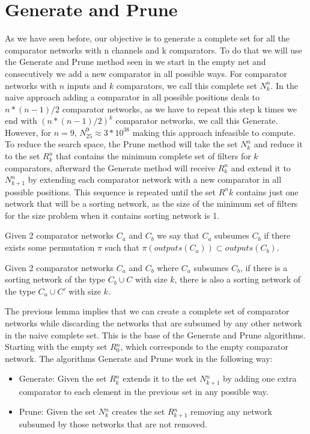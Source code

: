 \documentclass[../main.tex]{subfiles}
\begin{document}
	\section{Generate and Prune}
	As we have seen before, our objective is to generate a complete set for all the comparator networks with n channels and k comparators. To do that we will use the Generate and Prune method seen in \cite{sortingnineinputs} we start in the empty net and consecutively we add a new comparator in all possible ways. For comparator networks with $n$ inputs and $k$ comparators, we call this complete set $N^{n}_{k}$. In the naive approach adding a comparator in all possible positions deals to $n*(n-1)/2$ comparator networks, as we have to repeat this step k times we end with $(n*(n-1)/2)^k$ comparator networks, we call this Generate. However, for $n=9$, $N^{9}_{25}\approx 3*10^{38}$ making this approach infeasible to compute. To reduce the search space, the Prune method will take the set $N^{n}_{k}$ and reduce it to the set $R^{n}_{k}$ that contains the minimum complete set of filters for $k$ comparators, afterward the Generate method will receive $R^{n}_{k}$ and extend it to $N^{n}_{k+1}$ by extending each comparator network with a new comparator in all possible positions. This sequence is repeated until the set $R^{n}{k}$ contains just one network that will be a sorting network, as the size of the minimum set of filters for the size problem when it contains sorting network is 1.
	
	\begin{definition}
		Given 2 comparator networks $C_a$ and $C_b$ we say that $C_a$ subsumes $C_b$ if there exists some permutation $\pi$ such that $\pi (outputs(C_a)) \subset outputs(C_b)$.
	\end{definition}
	
	\begin{lemma}
		Given 2 comparator networks $C_a$ and $C_b$ where $C_a$ subsumes $C_b$, if there is a sorting network of the type $C_b \cup C$ with size $k$, there is also a sorting network of the type $C_a \cup C'$ with size $k$.
	\end{lemma}
	
	The previous lemma implies that we can create a complete set of comparator networks while discarding the networks that are subsumed by any other network in the naive complete set. This is the base of the Generate and Prune algorithms. Starting with the empty set $R{^n_0}$, which corresponds to the empty comparator network. The algorithms Generate and Prune work in the following way:
	
	\begin{itemize}
		\item Generate: Given the set $R{^n_k}$ extends it to the set $N{^n_{k+1}}$ by adding one extra comparator to each element in the previous set in any possible way.
		\item Prune: Given the set $N{^n_k}$ creates the set $R{^n_{k+1}}$ removing any network subsumed by those networks that are not removed.
	\end{itemize}
\end{document}
